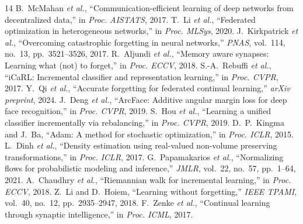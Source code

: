 \documentclass[conference]{IEEEtran}
\begin{document}
\begin{thebibliography}{14}
 B.~McMahan \textit{et al.}, ``Communication-efficient learning of deep networks from decentralized data,'' in \textit{Proc. AISTATS}, 2017.
 T.~Li \textit{et al.}, ``Federated optimization in heterogeneous networks,'' in \textit{Proc. MLSys}, 2020.
 J.~Kirkpatrick \textit{et al.}, ``Overcoming catastrophic forgetting in neural networks,'' \textit{PNAS}, vol.~114, no.~13, pp.~3521--3526, 2017.
 R.~Aljundi \textit{et al.}, ``Memory aware synapses: Learning what (not) to forget,'' in \textit{Proc. ECCV}, 2018.
 S.-A.~Rebuffi \textit{et al.}, ``iCaRL: Incremental classifier and representation learning,'' in \textit{Proc. CVPR}, 2017.
 Y.~Qi \textit{et al.}, ``Accurate forgetting for federated continual learning,'' \textit{arXiv preprint}, 2024.
 J.~Deng \textit{et al.}, ``ArcFace: Additive angular margin loss for deep face recognition,'' in \textit{Proc. CVPR}, 2019.
 S.~Hou \textit{et al.}, ``Learning a unified classifier incrementally via rebalancing,'' in \textit{Proc. CVPR}, 2019.
 D.~P.~Kingma and J.~Ba, ``Adam: A method for stochastic optimization,'' in \textit{Proc. ICLR}, 2015.
 L.~Dinh \textit{et al.}, ``Density estimation using real-valued non-volume preserving transformations,'' in \textit{Proc. ICLR}, 2017.
 G.~Papamakarios \textit{et al.}, ``Normalizing flows for probabilistic modeling and inference,'' \textit{JMLR}, vol.~22, no.~57, pp.~1--64, 2021.
 A.~Chaudhry \textit{et al.}, ``Riemannian walk for incremental learning,'' in \textit{Proc. ECCV}, 2018.
 Z.~Li and D.~Hoiem, ``Learning without forgetting,'' \textit{IEEE TPAMI}, vol.~40, no.~12, pp.~2935--2947, 2018.
 F.~Zenke \textit{et al.}, ``Continual learning through synaptic intelligence,'' in \textit{Proc. ICML}, 2017.
\end{thebibliography}
\end{document}

